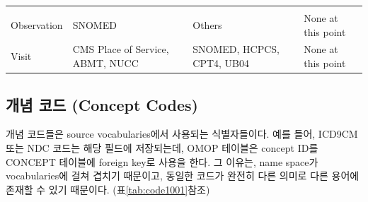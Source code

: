 \documentclass[11pt]{book}
\theoremstyle{definition}
\theoremstyle{definition}
\theoremstyle{definition}
\theoremstyle{remark}
\begin{document}
\begin{longtable}[]{@{}llll@{}}
\begin{minipage}[t]{0.18\columnwidth}
\end{minipage}\tabularnewline
\begin{minipage}[t]{0.12\columnwidth}\raggedright\strut
Observation\strut
\end{minipage} & \begin{minipage}[t]{0.21\columnwidth}\raggedright\strut
SNOMED\strut
\end{minipage} & \begin{minipage}[t]{0.21\columnwidth}\raggedright\strut
Others\strut
\end{minipage} & \begin{minipage}[t]{0.18\columnwidth}\raggedright\strut
None at this point\strut
\end{minipage}\tabularnewline
\begin{minipage}[t]{0.12\columnwidth}\raggedright\strut
Visit\strut
\end{minipage} & \begin{minipage}[t]{0.21\columnwidth}\raggedright\strut
CMS Place of Service, ABMT, NUCC\strut
\end{minipage} & \begin{minipage}[t]{0.21\columnwidth}\raggedright\strut
SNOMED, HCPCS, CPT4, UB04\strut
\end{minipage} & \begin{minipage}[t]{0.18\columnwidth}\raggedright\strut
None at this point\strut
\end{minipage}\tabularnewline
\bottomrule
\end{longtable}

\subsection{개념 코드 (Concept Codes)}\label{--concept-codes}

개념 코드들은 source vocabularies에서 사용되는 식별자들이다. 예를 들어,
ICD9CM 또는 NDC 코드는 해당 필드에 저장되는데, OMOP 테이블은 concept
ID를 CONCEPT 테이블에 foreign key로 사용을 한다. 그 이유는, name space가
vocabularies에 걸쳐 겹치기 때문이고, 동일한 코드가 완전히 다른 의미로
다른 용어에 존재할 수 있기 때문이다. (표\ref{tab:code1001}참조)
\end{document}
